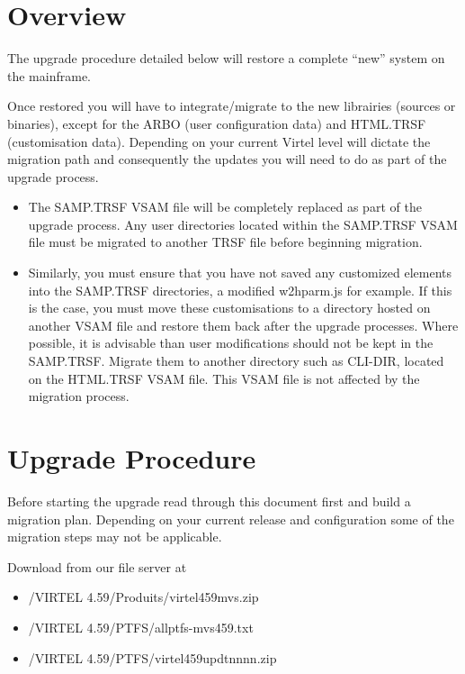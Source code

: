 \documentclass[letterpaper,10pt,english]{sphinxmanual}
\begin{document}
\section{Overview}
\label{\detokenize{Migration_Guide:overview}}
The upgrade procedure detailed below will restore a complete “new” system on the mainframe.

Once restored you will have to integrate/migrate to the new librairies (sources or binaries), except for the ARBO (user configuration data) and HTML.TRSF (customisation data). Depending on your current Virtel level will dictate the migration path and consequently the updates you will need to do as part of the upgrade process.
\begin{itemize}
\item {} 
The SAMP.TRSF VSAM file will be completely replaced as part of the upgrade process. Any user directories located within the SAMP.TRSF VSAM file must be migrated to another TRSF file before beginning migration.

\item {} 
Similarly, you must ensure that you have not saved any customized elements into the SAMP.TRSF directories, a modified w2hparm.js for example. If this is the case, you must move these customisations to a directory hosted on another VSAM file and restore them back after the upgrade processes. Where possible, it is advisable than user modifications should not be kept in the SAMP.TRSF. Migrate them to another directory such as CLI-DIR, located on the HTML.TRSF VSAM file. This VSAM file is not affected by the migration process.

\end{itemize}

\newpage

\ignorespaces 

\section{Upgrade Procedure}
\label{\detokenize{Migration_Guide:upgrade-procedure}}\label{\detokenize{Migration_Guide:index-1}}
Before starting the upgrade read through this document first and build a migration plan. Depending on your current release and configuration some of the migration steps may not be applicable.

Download from our file server at 
\begin{itemize}
\item {} 
/VIRTEL 4.59/Produits/virtel459mvs.zip

\item {} 
/VIRTEL 4.59/PTFS/allptfs-mvs459.txt

\item {} 
/VIRTEL 4.59/PTFS/virtel459updtnnnn.zip

\end{itemize}
\end{document}
